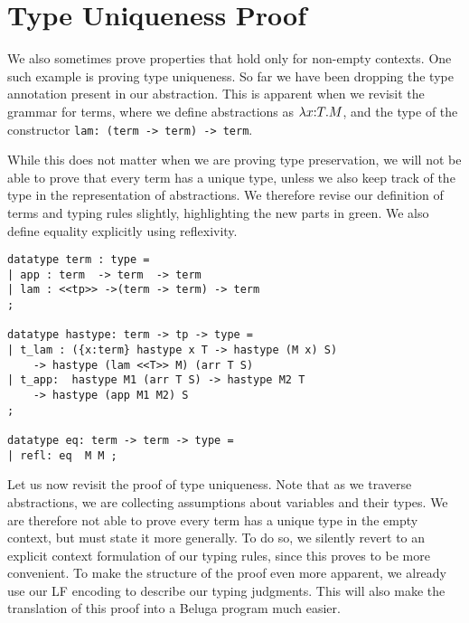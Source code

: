





\section{Type Uniqueness Proof}
We also sometimes prove properties that hold only for non-empty
contexts. One such example is proving type uniqueness. So far we have
been dropping the type annotation present in our abstraction. This is
apparent when we revisit the grammar for terms, where we define
abstractions as $\lambda x{:}T.M$, and the type of the constructor
\lstinline!lam: (term -> term) -> term!.

While this does not matter when we are proving type preservation, we
will not be able to prove that every term has a unique type, unless we
also keep track of the type in the representation of abstractions. We
therefore revise our definition of terms and typing rules slightly,
highlighting the new parts in green. We also define equality
explicitly using reflexivity.

\begin{lstlisting}
datatype term : type =
| app : term  -> term  -> term
| lam : <<tp>> ->(term -> term) -> term
;

datatype hastype: term -> tp -> type =
| t_lam : ({x:term} hastype x T -> hastype (M x) S)
	-> hastype (lam <<T>> M) (arr T S)
| t_app:  hastype M1 (arr T S) -> hastype M2 T
	-> hastype (app M1 M2) S
;

datatype eq: term -> term -> type =
| refl: eq  M M ;
\end{lstlisting}

Let us now revisit the proof of type uniqueness. Note that as we traverse
abstractions, we are collecting assumptions about variables and their
types. We are therefore not able to prove every term has a unique type
in the empty context, but must state it more generally. To do so, we
silently revert to an explicit context formulation of our typing
rules, since this proves to be more convenient. To make the structure
of the proof even more apparent, we already use our LF encoding to
describe our typing judgments. This will also make the translation of
this proof into a Beluga program much easier.

